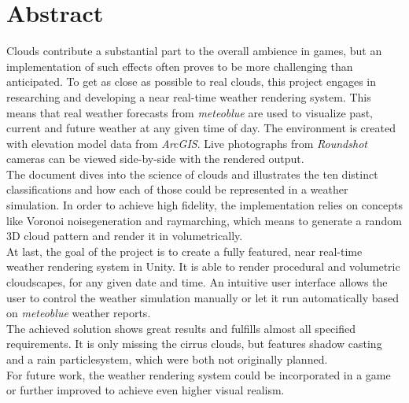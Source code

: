 \section*{Abstract}
Clouds contribute a substantial part to the overall ambience in games, but an implementation of such effects often proves to be more challenging than anticipated.
To get as close as possible to real clouds, this project engages in researching and developing a near real-time weather rendering system.
This means that real weather forecasts from \emph{meteoblue} are used to visualize past, current and future weather at any given time of day.
The environment is created with elevation model data from \emph{ArcGIS}. Live photographs from \emph{Roundshot} cameras can be viewed side-by-side with the rendered output.
\\
The document dives into the science of clouds and illustrates the ten distinct classifications and how each of those could be represented in a weather simulation. 
In order to achieve high fidelity, the implementation relies on concepts like Voronoi \gls{noisegeneration} and \gls{raymarching}, which means to generate a random 3D cloud pattern and render it in volumetrically.
\\
At last, the goal of the project is to create a fully featured, near real-time weather rendering system in Unity.
It is able to render \gls{procedural} and volumetric cloudscapes, for any given date and time.
An intuitive user interface allows the user to control the weather simulation manually or let it run automatically based on \emph{meteoblue} weather reports.
\\
The achieved solution shows great results and fulfills almost all specified requirements.
It is only missing the cirrus clouds, but features shadow casting and a rain \gls{particlesystem}, which were both not originally planned.
\\
For future work, the weather rendering system could be incorporated in a game or further improved to achieve even higher visual realism.